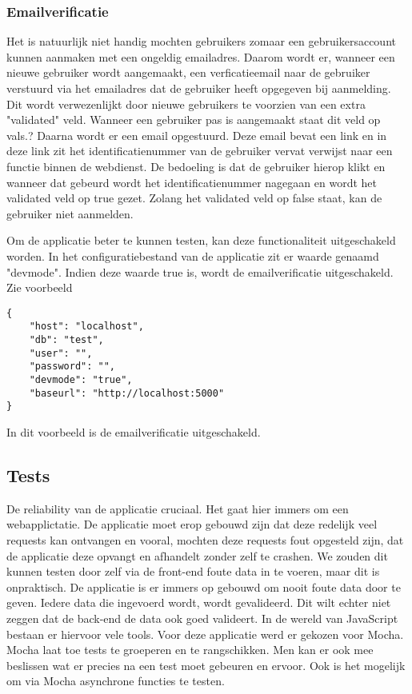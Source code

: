 \documentclass[a4paper,11pt]{article}
\begin{document}
\subsubsection{Emailverificatie}
Het is natuurlijk niet handig mochten gebruikers zomaar een gebruikersaccount kunnen aanmaken met een ongeldig emailadres. Daarom wordt er, wanneer een nieuwe gebruiker wordt aangemaakt, een verficatieemail naar de gebruiker verstuurd via het emailadres dat de gebruiker heeft opgegeven bij aanmelding. Dit wordt verwezenlijkt door nieuwe gebruikers te voorzien van een extra "validated" veld. Wanneer een gebruiker pas is aangemaakt staat dit veld op vals.? Daarna wordt er een email opgestuurd. Deze email bevat een link en in deze link zit het identificatienummer van de gebruiker vervat verwijst naar een functie binnen de webdienst. De bedoeling is dat de gebruiker hierop klikt en wanneer dat gebeurd wordt het identificatienummer nagegaan en wordt het validated veld op true gezet. Zolang het validated veld op false staat, kan de gebruiker niet aanmelden.

Om de applicatie beter te kunnen testen, kan deze functionaliteit uitgeschakeld worden. In het configuratiebestand van de applicatie zit er waarde genaamd "devmode". Indien deze waarde true is, wordt de emailverificatie uitgeschakeld. Zie voorbeeld
\begin{lstlisting}
{
	"host": "localhost",
	"db": "test",
	"user": "",
	"password": "",
	"devmode": "true",
	"baseurl": "http://localhost:5000"
}
\end{lstlisting}
In dit voorbeeld is de emailverificatie uitgeschakeld.

\subsection{Tests}
De reliability van de applicatie cruciaal. Het gaat hier immers om een webapplictatie. De applicatie moet erop gebouwd zijn dat deze redelijk veel requests kan ontvangen en vooral, mochten deze requests fout opgesteld zijn, dat de applicatie deze opvangt en afhandelt zonder zelf te crashen. We zouden dit kunnen testen door zelf via de front-end foute data in te voeren, maar dit is onpraktisch. De applicatie is er immers op gebouwd om nooit foute data door te geven. Iedere data die ingevoerd wordt, wordt gevalideerd. Dit wilt echter niet zeggen dat de back-end de data ook goed valideert. In de wereld van JavaScript bestaan er hiervoor vele tools. Voor deze applicatie werd er gekozen voor Mocha. Mocha laat toe tests te groeperen en te rangschikken. Men kan er ook mee beslissen wat er precies na een test moet gebeuren en ervoor. Ook is het mogelijk om via Mocha asynchrone functies te testen.
\end{document}
